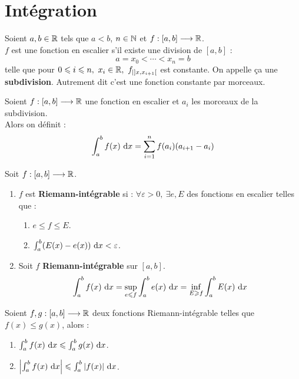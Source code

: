 \chapter{Intégration}
\def\arraystretch{1}

\begin{definition}
	Soient $a, b \in \mathbb{R}$ tels que $a < b$, $n \in \mathbb{N}$ et $f : [a, b] \longrightarrow \mathbb{R}$.
	\\
	$f$ est une fonction en escalier s'il existe une division de $[a, b]$ :
	\[ a = x_0 < \cdots < x_n = b \]
	telle que pour $0 \leqslant i \leqslant n,\ x_i \in \mathbb{R},\  f_{| ]x, x_{i+1}[}$ est constante. On appelle ça une \textbf{subdivision}.
	Autrement dit c'est une fonction constante par morceaux.
\end{definition}

\begin{definition}
	Soient $f : [a, b] \longrightarrow \mathbb{R}$ une fonction en escalier et $a_i$ les morceaux de la subdivision.
	\\
	Alors on définit :
	\[ \int_{a}^{b} f(x) \ \diffd x = \sum_{i = 1}^{n} f(a_i) (a_{i+1} - a_i) \]
\end{definition}

\begin{definition}
	Soit $f : [a, b] \longrightarrow \mathbb{R}$. 
	\begin{enumerate}
		\item $f$ est \textbf{Riemann-intégrable} si :
		$\forall \varepsilon > 0,\ \exists e, E$ des fonctions en escalier telles que :
		\begin{enumerate}
			\item $e \leq f \leq E$.
			\item $\int_{a}^{b} (E(x) - e(x)) \ \diffd x < \varepsilon$.
		\end{enumerate}
		\item Soit $f$ \textbf{Riemann-intégrable} sur $[a, b]$.
		\[ \int_{a}^{b} f(x) \ \diffd x = \underset{e \leq f}{\sup} \int_{a}^{b} e(x) \ \diffd x = \underset{E \geq f}{\inf} \int_{a}^{b} E(x) \ \diffd x \]
	\end{enumerate}
\end{definition}

\begin{lemma}
	Soient $f, g : [a, b] \longrightarrow \mathbb{R}$ deux fonctions Riemann-intégrable telles que $f(x) \leq g(x)$, alors :
	\begin{enumerate}
		\item $\int_{a}^{b} f(x) \ \diffd x \leq \int_{a}^{b} g(x) \ \diffd x$.
		\item $\abs{\int_{a}^{b} f(x) \ \diffd x} \leq \int_{a}^{b} \abs{f(x)} \ \diffd x$.
	\end{enumerate}
\end{lemma}

